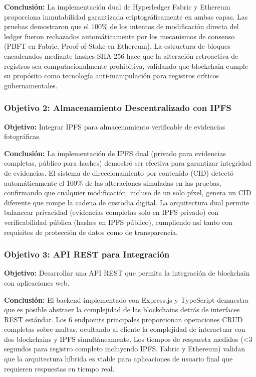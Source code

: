 \textbf{Conclusión:} La implementación dual de Hyperledger Fabric y Ethereum proporciona inmutabilidad garantizada criptográficamente en ambas capas. Las pruebas demostraron que el 100\% de los intentos de modificación directa del ledger fueron rechazados automáticamente por los mecanismos de consenso (PBFT en Fabric, Proof-of-Stake en Ethereum). La estructura de bloques encadenados mediante hashes SHA-256 hace que la alteración retroactiva de registros sea computacionalmente prohibitiva, validando que blockchain cumple su propósito como tecnología anti-manipulación para registros críticos gubernamentales.

\subsubsection{Objetivo 2: Almacenamiento Descentralizado con IPFS}

\textbf{Objetivo:} Integrar IPFS para almacenamiento verificable de evidencias fotográficas.

\textbf{Conclusión:} La implementación de IPFS dual (privado para evidencias completas, público para hashes) demostró ser efectiva para garantizar integridad de evidencias. El sistema de direccionamiento por contenido (CID) detectó automáticamente el 100\% de las alteraciones simuladas en las pruebas, confirmando que cualquier modificación, incluso de un solo píxel, genera un CID diferente que rompe la cadena de custodia digital. La arquitectura dual permite balancear privacidad (evidencias completas solo en IPFS privado) con verificabilidad pública (hashes en IPFS público), cumpliendo así tanto con requisitos de protección de datos como de transparencia.

\subsubsection{Objetivo 3: API REST para Integración}

\textbf{Objetivo:} Desarrollar una API REST que permita la integración de blockchain con aplicaciones web.

\textbf{Conclusión:} El backend implementado con Express.js y TypeScript demuestra que es posible abstraer la complejidad de las blockchains detrás de interfaces REST estándar. Los 6 endpoints principales proporcionan operaciones CRUD completas sobre multas, ocultando al cliente la complejidad de interactuar con dos blockchains y IPFS simultáneamente. Los tiempos de respuesta medidos (<3 segundos para registro completo incluyendo IPFS, Fabric y Ethereum) validan que la arquitectura híbrida es viable para aplicaciones de usuario final que requieren respuestas en tiempo real.

